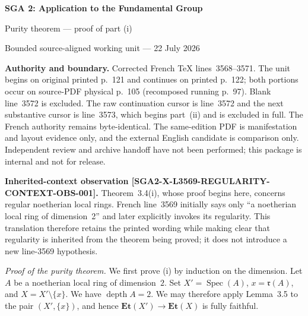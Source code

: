 \documentclass[10pt,a4paper]{article}
\newcommand{\Et}{\mathbf{Et}}
\newcommand{\Spec}{\operatorname{Spec}}
\newcommand{\depthop}{\operatorname{depth}}
\begin{document}
\begin{center}
  {\Large\bfseries SGA 2: Application to the Fundamental Group}\par\smallskip
  {\large Purity theorem --- proof of part \textup{(i)}}\par
  {\normalsize Bounded source-aligned working unit --- 22 July 2026}
\end{center}

\noindent\colorbox{softgray}{\parbox{0.95\linewidth}{\footnotesize\textbf{Authority and boundary.}
Corrected French TeX lines~3568--3571. The unit begins on original printed
p.~121 and continues on printed p.~122; both portions occur on source-PDF
physical p.~105 (recomposed running p.~97). Blank line~3572 is excluded.
The raw continuation cursor is line~3572 and the next substantive cursor is
line~3573, which begins part~\textup{(ii)} and is excluded in full. The French
authority remains byte-identical. The same-edition PDF is manifestation and
layout evidence only, and the external English candidate is comparison only.
Independent review and archive handoff have not been performed; this package
is internal and not for release.}}

\medskip
\noindent\colorbox{softblue}{\parbox{0.95\linewidth}{\footnotesize
\textbf{Inherited-context observation
[SGA2-X-L3569-REGULARITY-CONTEXT-OBS-001].}
Theorem~3.4\textup{(i)}, whose proof begins here, concerns regular noetherian
local rings. French line~3569 initially says only ``a noetherian local ring of
dimension~2'' and later explicitly invokes its regularity. This translation
therefore retains the printed wording while making clear that regularity is
inherited from the theorem being proved; it does not introduce a new
line-3569 hypothesis.}}

\medskip
\textit{Proof of the purity theorem.}
We first prove \textup{(i)} by induction on the dimension. Let $A$ be a
noetherian local ring of dimension~$2$. Set
$X'=\Spec(A)$, $x=\mathfrak r(A)$, and $X=X'\setminus\{x\}$. We have
$\depthop A=2$. We may therefore apply Lemma~3.5 to the pair
$(X',\{x\})$, and hence
$\Et(X')\longrightarrow\Et(X)$ is fully faithful.
\end{document}
